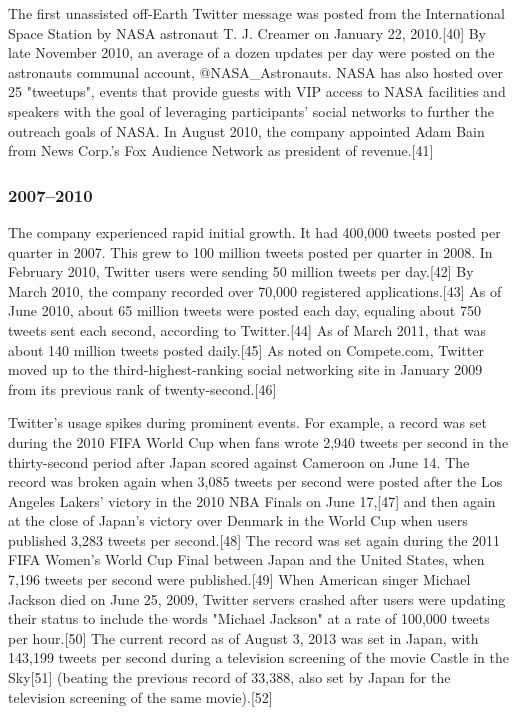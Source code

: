 \documentclass[12pt]{article}
\begin{document}
The first unassisted off-Earth Twitter message was posted from the International Space Station by NASA astronaut T. J. Creamer on January 22, 2010.[40] By late November 2010, an average of a dozen updates per day were posted on the astronauts communal account, @NASA\_Astronauts. NASA has also hosted over 25 "tweetups", events that provide guests with VIP access to NASA facilities and speakers with the goal of leveraging participants' social networks to further the outreach goals of NASA. In August 2010, the company appointed Adam Bain from News Corp.'s Fox Audience Network as president of revenue.[41] 








\subsubsection{2007–2010}


The company experienced rapid initial growth. It had 400,000 tweets posted per quarter in 2007. This grew to 100 million tweets posted per quarter in 2008. In February 2010, Twitter users were sending 50 million tweets per day.[42] By March 2010, the company recorded over 70,000 registered applications.[43] As of June 2010, about 65 million tweets were posted each day, equaling about 750 tweets sent each second, according to Twitter.[44] As of March 2011, that was about 140 million tweets posted daily.[45] As noted on Compete.com, Twitter moved up to the third-highest-ranking social networking site in January 2009 from its previous rank of twenty-second.[46]




Twitter's usage spikes during prominent events. For example, a record was set during the 2010 FIFA World Cup when fans wrote 2,940 tweets per second in the thirty-second period after Japan scored against Cameroon on June 14. The record was broken again when 3,085 tweets per second were posted after the Los Angeles Lakers' victory in the 2010 NBA Finals on June 17,[47] and then again at the close of Japan's victory over Denmark in the World Cup when users published 3,283 tweets per second.[48] The record was set again during the 2011 FIFA Women's World Cup Final between Japan and the United States, when 7,196 tweets per second were published.[49] When American singer Michael Jackson died on June 25, 2009, Twitter servers crashed after users were updating their status to include the words "Michael Jackson" at a rate of 100,000 tweets per hour.[50] The current record as of August 3, 2013 was set in Japan, with 143,199 tweets per second during a television screening of the movie Castle in the Sky[51] (beating the previous record of 33,388, also set by Japan for the television screening of the same movie).[52]
\end{document}
